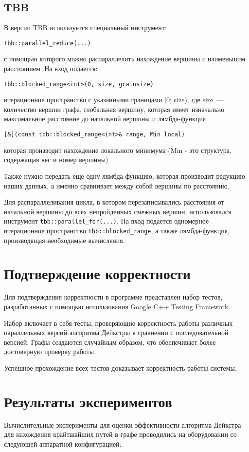 \documentclass{report}
\begin{document}
\subsection*{TBB}
В версии TBB используется специальный инструмент:
\par\verb|tbb::parallel_reduce(...)|
\par с помощью которого можно распараллелить нахождение вершины с наименьшим расстоянием. На вход подается: \par\verb|tbb::blocked_range<int>(0, size, grainsize)| 
\par итерационное пространство с указанными границами [0; size), где size~--- количество вершин графа, глобальная вершину, которая имеет изначально максимальное расстояние до начальной вершины и лямбда-функция \par\verb|[&](const tbb::blocked_range<int>& range, Min local) | 
\par которая производит нахождение локального минимума (Min - это структура, содержащая вес и номер вершины) 
\par Также нужно передать еще одну лямбда-функцию, которая производит редукцию наших данных, а именно сравнивает между собой вершины по расстоянию.
\par Для распараллеливания цикла, в котором перезаписывались расстояния от начальной вершины до всех непройденных смежных вершин, использовался инструмент  \verb|tbb::parallel_for(...)|. На вход подается одномерное итерационное пространство \verb|tbb::blocked_range|, а также лямбда-функция, производящая необходимые вычисления.
\newpage


\section*{Подтверждение корректности}
Для подтверждения корректности в программе представлен набор тестов, разработанных с помощью использования Google C++ Testing Framework.
\par Набор включает в себя тесты, проверяющие корректность работы различных параллельных версий алгоритма Дейкстры в сравнении с последовательной версией. Графы создаются случайным образом, что обеспечивает более достоверную проверку работы.
\par Успешное прохождение всех тестов доказывает корректность работы системы.

\newpage

\section*{Результаты экспериментов}
Вычислительные эксперименты для оценки эффективности алгоритма Дейкстра для нахождения крайтшайших путей в графе проводились на оборудовании со следующей аппаратной конфигурацией:
\end{document}
